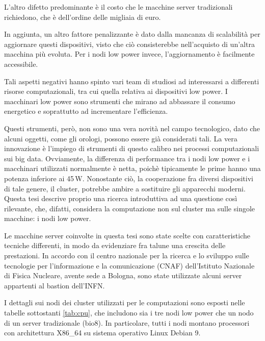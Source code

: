 L'altro difetto predominante è il costo che le macchine server tradizionali richiedono, che è dell'ordine delle migliaia di euro.

In aggiunta, un altro fattore penalizzante è dato dalla mancanza di scalabilità per aggiornare questi dispositivi, visto che ciò consisterebbe nell'acquisto di un'altra macchina più evoluta. 
Per i nodi low power invece, l'aggiornamento è facilmente accessibile.

Tali aspetti negativi hanno spinto vari team di studiosi ad interessarsi a differenti risorse computazionali, tra cui quella relativa ai dispositivi low power.
I macchinari low power sono strumenti che mirano ad abbassare il consumo energetico e soprattutto ad incrementare l'efficienza.

Questi strumenti, però, non sono una vera novità nel campo tecnologico, dato che alcuni oggetti, come gli orologi, possono essere già considerati tali.
La vera innovazione è l'impiego di strumenti di questo calibro nei processi computazionali sui big data.
Ovviamente, la differenza di performance tra i nodi low power e i macchinari utilizzati normalmente è netta, poichè tipicamente le prime hanno una potenza inferiore ai 45\,W.
Nonostante ciò, la cooperazione fra diversi dispositivi di tale genere, il cluster, potrebbe ambire a sostituire gli apparecchi moderni.
Questa tesi descrive proprio una ricerca introduttiva ad una questione così rilevante, che, difatti, considera la computazione non sul cluster ma sulle singole macchine: i nodi low power.

Le macchine server coinvolte in questa tesi sono state scelte con caratteristiche tecniche differenti, in modo da evidenziare fra talune una crescita delle prestazioni.
In accordo con il centro nazionale per la ricerca e lo sviluppo sulle tecnologie per l'informazione e la comunicazione (CNAF) dell'Istituto Nazionale di Fisica Nucleare, avente sede a Bologna, sono state utilizzate alcuni server appartenti al bastion dell'INFN.

I dettagli sui nodi dei cluster utilizzati per le computazioni sono esposti nelle tabelle sottostanti \ref{tab:cpu}, che includono sia i tre nodi low power che un nodo di un server tradizionale (bio8).
In particolare, tutti i nodi montano processori con architettura X86\_64 su sistema operativo Linux Debian 9.


